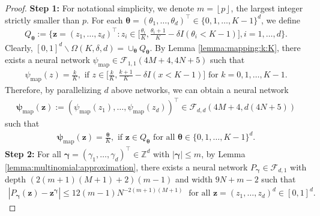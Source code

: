 \documentclass[11pt, preprint]{imsart}
\numberwithin{equation}{section}
\def \mcF{\mathcal{F}}
\def \bfgamma{\bm{\gamma}}
\def \bfz{\mathbf{z}}
\def \bftheta{\bm{\theta}}
\newcommand{\floor}[1]{\left\lfloor #1 \right\rfloor}
\theoremstyle{plain}
\theoremstyle{definition}
\begin{document}
\begin{proof}
\noindent \textbf{Step 1:} For notational simplicity, we denote $m=\floor{p}$, the largest integer strictly smaller than $p$. 
For each $\bftheta=(\theta_1, \ldots, \theta_d)^\top \in \{0, 1, \ldots, K-1\}^d$, we define 
\begin{eqnarray}
	Q_{\bftheta}:=\bigg\{\bfz=(z_1, \ldots, z_d)^\top: z_i\in \bigg[\frac{\theta_i}{K}, \frac{\theta_i+1}{K}-\delta I(\theta_i<K-1) \bigg], i=1,\ldots, d\bigg\}.\nonumber
\end{eqnarray}
Clearly, $[0,1]^d\backslash \Omega(K, \delta, d)=\cup_{\bftheta}Q_{\bftheta}$.
By Lemma \ref{lemma:mapping:k:K}, there exists a neural network $\psi_{\textrm{map}}\in \mcF_{1,1}(4M+4, 4N+5)$ such that
\begin{eqnarray}
	\psi_{\textrm{map}}(z)=\frac{k}{K}, \textrm{ if } z\in \bigg[\frac{k}{K},\frac{k+1}{K}-\delta I(x<K-1)\bigg] \textrm{ for } k=0,1,\ldots, K-1.\nonumber
\end{eqnarray}
Therefore, by parallelizing $d$ above networks, we can obtain a neural network
\begin{eqnarray}
	\bm{\psi}_{\textrm{map}}(\bfz):=(\psi_{\textrm{map}}(z_1),\ldots, \psi_{\textrm{map}}(z_d))^\top \in \mcF_{d, d}(4M+4, d(4N+5))\nonumber
\end{eqnarray} 
such that
\begin{eqnarray}
	\bm{\psi}_{\textrm{map}}(\bfz)=\frac{\bftheta}{K}, \textrm{ if } \bfz\in Q_{\bftheta} \textrm{ for all } \bftheta\in \{0, 1,\ldots, K-1\}^d.\label{eq:lemma:approximation:p:c:smooth:step:1:conclusion}
\end{eqnarray}
\noindent \textbf{Step 2:}  For all $\bfgamma=(\gamma_1, \ldots, \gamma_d)^\top \in \mathbb{Z}^d$ with $|\bfgamma|\leq m$, by Lemma \ref{lemma:multinomial:approximation}, there exists a neural network $P_{\bfgamma}\in \mcF_{d, 1}$ with depth $(2(m+1)(M+1)+2)(m-1)$ and width $9N+m-2$ such that
\begin{eqnarray}
	|P_{\bfgamma}(\bfz)-\bfz^{\bfgamma}|\leq 12(m-1)N^{-2(m+1)(M+1)} \; \textrm{ for all } \bfz=(z_1,\ldots, z_d)^d \in [0, 1]^d.\label{eq:lemma:approximation:p:c:smooth:step:2:eq0}
\end{eqnarray}


\end{proof}
\end{document}
